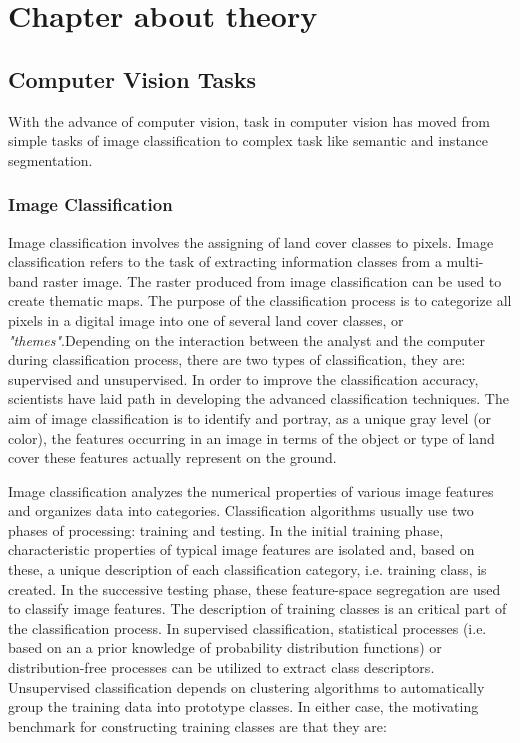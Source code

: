 \chapter{Chapter about theory}\label{ch:THEORY}
\section{Computer Vision Tasks}
With the advance of computer vision, task in computer vision has moved from simple tasks  of image classification to complex task like semantic and instance segmentation. 
\subsection{Image Classification}
Image classification involves the assigning of land cover classes to pixels. Image classification refers
to the task of extracting information classes from a multi-band raster image. The raster produced from image classification can be used to create thematic maps. The purpose of the classification process is to categorize all pixels in a digital image into one of several land cover classes, or \textit{"themes"}.Depending on the interaction between the analyst and the computer during classification process, there are two types of classification, they are: supervised and unsupervised. In order to improve the classification accuracy, scientists have laid path in developing the advanced classification techniques. The aim of image classification is to identify and portray, as a unique gray level (or color), the features occurring in an image in terms of the object or type of land cover these features actually represent on the ground. 

Image classification analyzes the numerical properties of various image features and organizes data into categories. Classification algorithms usually use two phases of processing: training and testing. In the initial training phase, characteristic properties of typical image features are isolated and, based on these, a unique description of each classification category, i.e. training class, is created. In the successive testing phase, these feature-space segregation are used to classify image features. The description of training classes is an critical part of the classification process. In supervised classification, statistical processes (i.e. based on an a prior knowledge of probability distribution functions) or distribution-free processes can be utilized to extract class descriptors. Unsupervised classification depends on clustering algorithms to automatically group the training data into prototype classes. In either case, the motivating benchmark for constructing training classes are that they are:

